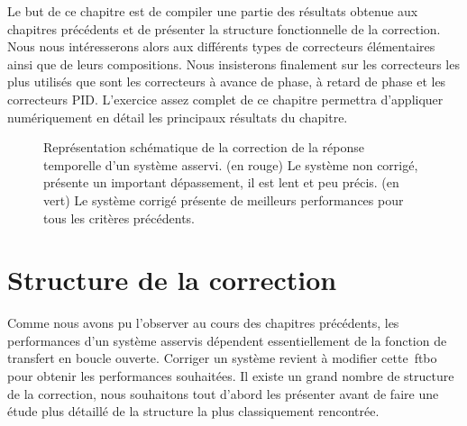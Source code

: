 Le but de ce chapitre est de compiler une partie des résultats obtenue aux
chapitres précédents et de présenter la structure fonctionnelle de la 
correction. Nous nous intéresserons alors aux différents types de correcteurs 
élémentaires ainsi que de leurs compositions. Nous insisterons finalement
sur les correcteurs les plus utilisés que sont les correcteurs à avance de
phase, à retard de phase et les correcteurs PID.
L'exercice assez complet de ce chapitre permettra d'appliquer numériquement
en détail les principaux résultats du chapitre. 
\captionsetup{width=0.7\linewidth}
\begin{figure}[!b]
    \centering
    
    \caption{Représentation schématique de la correction de la réponse 
             temporelle d'un système asservi. (en rouge) Le système non corrigé,
             présente un important dépassement, il est lent et peu précis. 
             (en vert) Le système corrigé présente de meilleurs performances 
             pour tous les critères précédents.\label{fig-necessite_correction}}
\end{figure}
\captionsetup{width=0.9\linewidth}
\clearpage
\section{Structure de la correction}
Comme nous avons pu l'observer au cours des chapitres précédents, les 
performances d'un système asservis dépendent essentiellement de la fonction
de transfert en boucle ouverte. Corriger un système revient à modifier 
cette~\gls{ftbo} pour obtenir les performances souhaitées. Il existe un grand
nombre de structure de la correction, nous souhaitons tout d'abord les 
présenter avant de faire une étude plus détaillé de la structure la plus 
classiquement rencontrée. 


